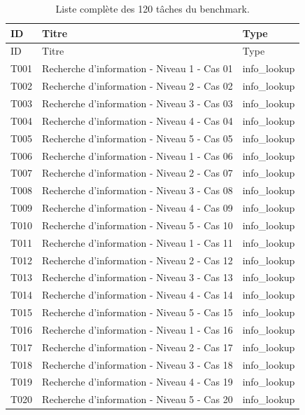 \begingroup
\scriptsize
\setlength{\tabcolsep}{4pt}
\begin{longtable}{@{}lll@{}}
\caption{Liste complète des 120 tâches du benchmark.}\label{tab:alltasks}\\
\toprule
ID & Titre & Type \\
\midrule
\endfirsthead
\toprule
ID & Titre & Type \\
\midrule
\endhead
T001 & Recherche d'information - Niveau 1 - Cas 01 & info\_lookup \\
T002 & Recherche d'information - Niveau 2 - Cas 02 & info\_lookup \\
T003 & Recherche d'information - Niveau 3 - Cas 03 & info\_lookup \\
T004 & Recherche d'information - Niveau 4 - Cas 04 & info\_lookup \\
T005 & Recherche d'information - Niveau 5 - Cas 05 & info\_lookup \\
T006 & Recherche d'information - Niveau 1 - Cas 06 & info\_lookup \\
T007 & Recherche d'information - Niveau 2 - Cas 07 & info\_lookup \\
T008 & Recherche d'information - Niveau 3 - Cas 08 & info\_lookup \\
T009 & Recherche d'information - Niveau 4 - Cas 09 & info\_lookup \\
T010 & Recherche d'information - Niveau 5 - Cas 10 & info\_lookup \\
T011 & Recherche d'information - Niveau 1 - Cas 11 & info\_lookup \\
T012 & Recherche d'information - Niveau 2 - Cas 12 & info\_lookup \\
T013 & Recherche d'information - Niveau 3 - Cas 13 & info\_lookup \\
T014 & Recherche d'information - Niveau 4 - Cas 14 & info\_lookup \\
T015 & Recherche d'information - Niveau 5 - Cas 15 & info\_lookup \\
T016 & Recherche d'information - Niveau 1 - Cas 16 & info\_lookup \\
T017 & Recherche d'information - Niveau 2 - Cas 17 & info\_lookup \\
T018 & Recherche d'information - Niveau 3 - Cas 18 & info\_lookup \\
T019 & Recherche d'information - Niveau 4 - Cas 19 & info\_lookup \\
T020 & Recherche d'information - Niveau 5 - Cas 20 & info\_lookup \\

\end{longtable}
